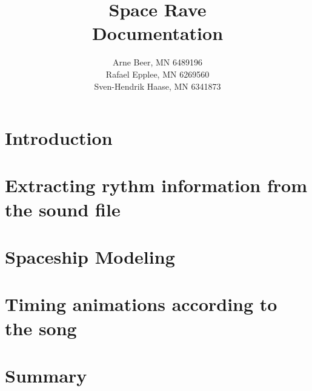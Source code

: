 \documentclass{article}
\title{Space Rave\\
    Documentation}
\author{Arne Beer, MN 6489196\\
Rafael Epplee, MN 6269560\\
Sven-Hendrik Haase, MN 6341873}
\begin{document}
\maketitle
    \section{Introduction}

    \section{Extracting rythm information from the sound file}

    \section{Spaceship Modeling}

    \section{Timing animations according to the song}

    \section{Summary}
\end{document}
